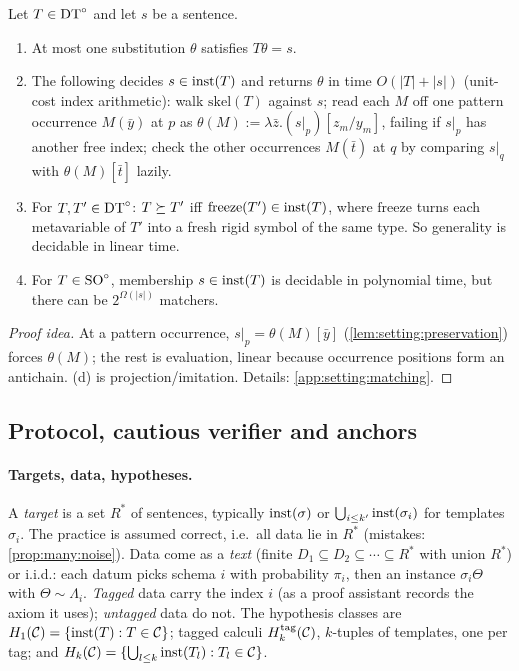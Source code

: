 \begin{theorem}[Matching]\label{thm:setting:matching}
Let $T\in\mathrm{DT}^{\circ}$ and let $s$ be a sentence.
\begin{enumerate}[label=(\alph*)]
\item At most one substitution $\theta$ satisfies $T\theta=s$.
\item The following decides $s\in\mathrm{inst}(T)$ and returns $\theta$ in time $O(|T|+|s|)$ (unit-cost index arithmetic): walk $\mathrm{skel}(T)$ against $s$; read each $M$ off one pattern occurrence $M(\bar y)$ at $p$ as $\theta(M):=\lambda\bar z.(s|_p)[z_m/y_m]$, failing if $s|_p$ has another free index; check the other occurrences $M(\bar t)$ at $q$ by comparing $s|_q$ with $\theta(M)[\bar t]$ lazily.
\item For $T,T'\in\mathrm{DT}^{\circ}$: $T\succeq T'$ iff $\mathrm{freeze}(T')\in\mathrm{inst}(T)$, where $\mathrm{freeze}$ turns each metavariable of $T'$ into a fresh rigid symbol of the same type. So generality is decidable in linear time.
\item For $T\in\mathrm{SO}^{\circ}$, membership $s\in\mathrm{inst}(T)$ is decidable in polynomial time, but there can be $2^{\Omega(|s|)}$ matchers.
\end{enumerate}
\end{theorem}

\begin{proof}[Proof idea]
At a pattern occurrence, $s|_p=\theta(M)[\bar y]$ (\cref{lem:setting:preservation}) forces $\theta(M)$; the rest is evaluation, linear because occurrence positions form an antichain. (d) is projection/imitation. Details: \cref{app:setting:matching}.
\end{proof}

\subsection{Protocol, cautious verifier and anchors}\label{sec:setting:learning}

\paragraph{Targets, data, hypotheses.}
A \emph{target} is a set $R^*$ of sentences, typically $\mathrm{inst}(\sigma)$ or $\bigcup_{i\le k'}\mathrm{inst}(\sigma_i)$ for templates $\sigma_i$. The practice is assumed correct, i.e.\ all data lie in $R^*$ (mistakes: \cref{prop:many:noise}). Data come as a \emph{text} (finite $D_1\subseteq D_2\subseteq\cdots\subseteq R^*$ with union $R^*$) or i.i.d.: each datum picks schema $i$ with probability $\pi_i$, then an instance $\sigma_i\Theta$ with $\Theta\sim\Lambda_i$. \emph{Tagged} data carry the index $i$ (as a proof assistant records the axiom it uses); \emph{untagged} data do not. The hypothesis classes are $H_{1}(\mathcal C)=\{\mathrm{inst}(T):T\in\mathcal C\}$; tagged calculi $H^{\mathrm{tag}}_{k}(\mathcal C)$, $k$-tuples of templates, one per tag; and $H_{k}(\mathcal C)=\{\bigcup_{l\le k}\mathrm{inst}(T_l):T_l\in\mathcal C\}$.

